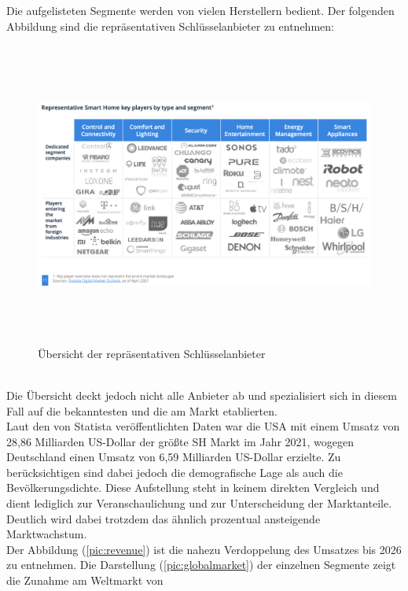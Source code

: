         \pagebreak
        Die aufgelisteten Segmente werden von vielen Herstellern bedient. Der folgenden Abbildung sind die repräsentativen Schlüsselanbieter zu entnehmen:
        \begin{figure}[hbt!]
            \centering
            \includegraphics[width=15cm,height=10cm,keepaspectratio]{images/keyplayers.png}
            \caption{Übersicht der repräsentativen Schlüsselanbieter \cite{statista2021}} 
            \label{pic:landscape}
        \end{figure}
        \\
        Die Übersicht deckt jedoch nicht alle Anbieter ab und spezialisiert sich in diesem Fall auf die bekanntesten und die am 
        Markt etablierten. 
        \\
        \linebreak
        Laut den von Statista veröffentlichten Daten war die USA mit einem Umsatz von 28,86 Milliarden US-Dollar der größte 
        \acl{SH} Markt im Jahr 2021, wogegen Deutschland einen Umsatz von 6,59 Milliarden US-Dollar erzielte. Zu berücksichtigen sind 
        dabei jedoch die demografische Lage als auch die Bevölkerungsdichte. Diese Aufstellung steht in keinem direkten Vergleich und 
        dient lediglich zur Veranschaulichung und zur Unterscheidung der Marktanteile. Deutlich wird dabei trotzdem das ähnlich prozentual ansteigende 
        Marktwachstum. 
        \\
        \linebreak
        Der Abbildung (\ref{pic:revenue}) ist die nahezu Verdoppelung des Umsatzes bis 2026 zu entnehmen. Die Darstellung 
        (\ref{pic:globalmarket}) der einzelnen Segmente zeigt die Zunahme am Weltmarkt von 
